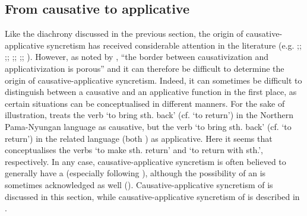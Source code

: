 \subsection{From causative to applicative} \label{diachrony:caus2appl}
Like the diachrony discussed in the previous section, the origin of causative-applicative syncretism has received considerable attention in the literature (e.g. \citealt[166ff.]{shibatani:pardeshi:2001};; \citeyear[116ff.]{shibatani:pardeshi:2002};; \citealt[64ff.]{peterson:2007};; \citealt[403ff.]{malchukov:2016};; \citeyear[13ff.]{malchukov:2017}). However, as noted by \citet[236]{zuniga:kittila:2019}, “the border between causativization and applicativization is porous” and it can therefore be difficult to determine the origin of causative-applicative syncretism. Indeed, it can sometimes be difficult to distinguish between a causative and an applicative function in the first place, as certain situations can be conceptualised in different manners. For the sake of illustration, \citet[14, 17]{austin:2005} treats the verb  ‘to bring sth. back’ (cf.  ‘to return’) in the Northern Pama-Nyungan language  as causative, but the verb  ‘to bring sth. back’ (cf.  ‘to return’) in the related language  (both ) as applicative. Here it seems that \citeauthor{austin:2005} conceptualises the verbs ‘to make sth. return’ and ‘to return with sth.’, respectively. In any case, causative-applicative syncretism is often believed to generally have a  (especially following \citealt{shibatani:pardeshi:2001, shibatani:pardeshi:2002}), although the possibility of an  is sometimes acknowledged as well (\citealt{wise:1990, payne:2002, guillaume:rose:2010, malchukov:2017}). Causative-applicative syncretism of  is discussed in this section, while causative-applicative syncretism of  is described in .

